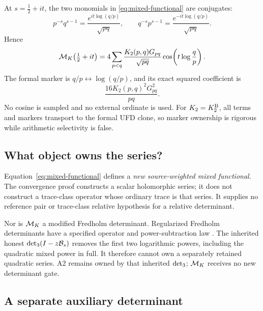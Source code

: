 At \(s=\tfrac12+it\), the two monomials in
\eqref{eq:mixed-functional} are conjugates:
\begin{equation}
 p^{-s}q^{s-1}=\frac{e^{it\log(q/p)}}{\sqrt{pq}},
 \qquad
 q^{-s}p^{s-1}=\frac{e^{-it\log(q/p)}}{\sqrt{pq}}.
 \label{eq:conjugate-monomials}
\end{equation}
Hence
\begin{equation}
 \mathcal M_K\!\left(\tfrac12+it\right)
 =4\sum_{p<q}\frac{K_2(p,q)G_{pq}}{\sqrt{pq}}
 \cos\!\left(t\log\frac qp\right).
 \label{eq:critical-mixed}
\end{equation}
The formal marker is
\(
q/p\leftrightarrow\log(q/p)
\), and its exact squared coefficient is
\begin{equation}
 \frac{16K_2(p,q)^2G_{pq}^2}{pq}.
 \label{eq:squared-marker}
\end{equation}
No cosine is sampled and no external ordinate is used.  For
\(K_2=K^{\mathrm B}_2\), all terms and markers transport to the formal UFD clone,
so marker ownership is rigorous while arithmetic selectivity is false.

\subsection{What object owns the series?}

Equation~\eqref{eq:mixed-functional} defines a \emph{new source-weighted
mixed functional}.  The convergence proof constructs a scalar holomorphic
series; it does not construct a trace-class operator whose ordinary trace is
that series.  It supplies no reference pair or trace-class relative
hypothesis for a relative determinant.

Nor is \(\mathcal M_K\) a modified Fredholm determinant.  Regularized Fredholm
determinants have a specified operator and power-subtraction law
\citep{BritzEtAl2021}.  The inherited honest \(\det_{3}(I-z\mathcal B_s)\) removes
the first two logarithmic powers, including the quadratic mixed power in
full.  It therefore cannot own a separately retained quadratic series.  A2
remains owned by that inherited \(\det_{3}\); \(\mathcal M_K\) receives no new
determinant gate.

\subsection{A separate auxiliary determinant}

